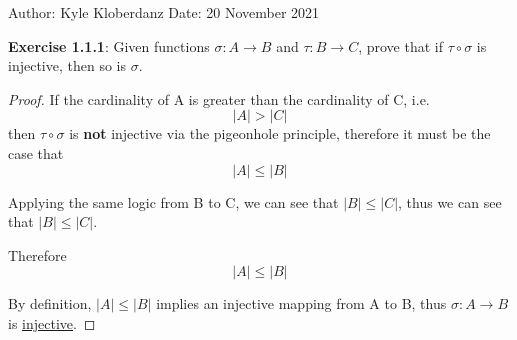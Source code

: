\documentclass[a4paper]{article}
\begin{document}
\begin{myparindent}{0pt}

Author: Kyle Kloberdanz \newline
Date: 20 November 2021 \newline

\textbf{Exercise 1.1.1}:
Given functions $\sigma: A \rightarrow B$ and $\tau: B \rightarrow C$,
prove that if $\tau \circ \sigma$ is injective, then so is $\sigma$.

\begin{proof}
If the cardinality of A is greater than the cardinality of C, i.e.
\[|A| > |C|\]
then $\tau \circ \sigma$ is \textbf{not} injective via the
pigeonhole principle, therefore it must be the case that
\[|A| \le |B|\]

Applying the same logic from B to C, we can see that $|B| \le |C|$,
thus we can see that $|B| \le |C|$. \newline

Therefore
\[|A| \le |B|\]

By definition, $|A| \le |B|$ implies an injective mapping from A to B,\newline
thus $\sigma: A \rightarrow B$ is \underline{injective}.
\end{proof}

\end{myparindent}
\end{document}
